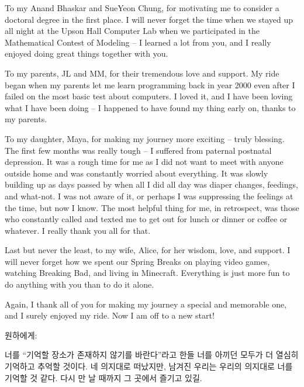 To my Anand Bhaskar and SueYeon Chung, for motivating me to consider a doctoral degree in the first place. I will never forget the time when we stayed up all night at the Upson Hall Computer Lab when we participated in the Mathematical Contest of Modeling -- I learned a lot from you, and I really enjoyed doing great things together with you. 

To my parents, JL and MM, for their tremendous love and support. My ride began when my parents let me learn programming back in year 2000 even after I failed on the most basic test about computers. I loved it, and I have been loving what I have been doing -- I happened to have found my thing early on, thanks to my parents. 

To my daughter, Maya, for making my journey more exciting -- truly blessing. The first few months was really tough -- I suffered from paternal postnatal depression. It was a rough time for me as I did not want to meet with anyone outside home and was constantly worried about everything. It was slowly building up as days passed by when all I did all day was diaper changes, feedings, and what-not. I was not aware of it, or perhaps I was suppressing the feelings at the time, but now I know. The most helpful thing for me, in retrospect, was those who constantly called and texted me to get out for lunch or dinner or coffee or whatever. I really thank you all for that.

Last but never the least, to my wife, Alice, for her wisdom, love, and support. I will never forget how we spent our Spring Breaks on playing video games, watching Breaking Bad, and living in Minecraft. Everything is just more fun to do anything with you than to do it alone. 

Again, I thank all of you for making my journey a special and memorable one, and I surely enjoyed my ride. Now I am off to a new start!


\vspace{10 em}

원하에게: 

너를 ``기억할 장소가 존재하지 않기를 바란다''라고 한들 너를 아끼던 모두가 더 열심히 기억하고 추억할 것이다. 네 의지대로 떠났지만, 남겨진 우리는 우리의 의지대로 너를 기억할 것 같다. 다시 만 날 때까지 그 곳에서 즐기고 있길.
